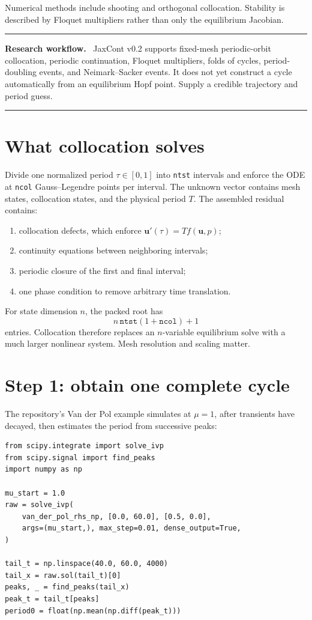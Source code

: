 \documentclass[11pt,oneside]{book}
\newcommand{\state}{\bm{u}}
\newenvironment{workflowbox}
  {\par\medskip\noindent\begin{minipage}{\textwidth}
   \color{JaxGreen!70!black}\rule{\textwidth}{0.8pt}\par
   \textbf{Research workflow.}\ \color{black}}
  {\par\color{JaxGreen!70!black}\rule{\textwidth}{0.8pt}
   \end{minipage}\par\medskip}
\begin{document}
Numerical methods include shooting and orthogonal collocation. Stability is
described by Floquet multipliers rather than only the equilibrium Jacobian.

\begin{workflowbox}
JaxCont v0.2 supports fixed-mesh periodic-orbit collocation, periodic
continuation, Floquet multipliers, folds of cycles, period-doubling events, and
Neimark--Sacker events. It does not yet construct a cycle automatically from
an equilibrium Hopf point. Supply a credible trajectory and period guess.
\end{workflowbox}

\section{What collocation solves}

Divide one normalized period $\tau\in[0,1]$ into
\texttt{ntst} intervals and enforce the ODE at \texttt{ncol}
Gauss--Legendre points per interval. The unknown vector contains mesh states,
collocation states, and the physical period $T$. The assembled residual
contains:

\begin{enumerate}
  \item collocation defects, which enforce $\state'(\tau)=T f(\state,p)$;
  \item continuity equations between neighboring intervals;
  \item periodic closure of the first and final interval;
  \item one phase condition to remove arbitrary time translation.
\end{enumerate}

For state dimension $n$, the packed root has
\[
  n\,\texttt{ntst}(1+\texttt{ncol})+1
\]
entries. Collocation therefore replaces an $n$-variable equilibrium solve with
a much larger nonlinear system. Mesh resolution and scaling matter.

\section{Step 1: obtain one complete cycle}

The repository's Van der Pol example simulates at $\mu=1$, after transients
have decayed, then estimates the period from successive peaks:

\begin{lstlisting}
from scipy.integrate import solve_ivp
from scipy.signal import find_peaks
import numpy as np

mu_start = 1.0
raw = solve_ivp(
    van_der_pol_rhs_np, [0.0, 60.0], [0.5, 0.0],
    args=(mu_start,), max_step=0.01, dense_output=True,
)

tail_t = np.linspace(40.0, 60.0, 4000)
tail_x = raw.sol(tail_t)[0]
peaks, _ = find_peaks(tail_x)
peak_t = tail_t[peaks]
period0 = float(np.mean(np.diff(peak_t)))
\end{lstlisting}
\end{document}

